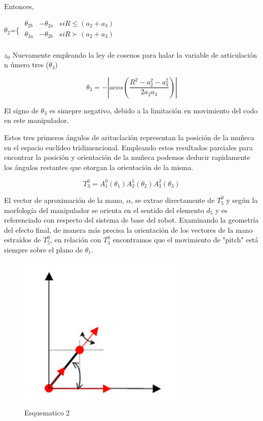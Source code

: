 \documentclass[letter,openright,12pt,spanish]{report}
\begin{document}
Entonces,

\begin{center}
$\theta_2$=\{ $\begin{matrix}
	\theta_{2b} & -\theta_{2a} & si R \leq (a_2+a_3)\\
	\theta_{2a} & -\theta_{2b} & si R \succ (a_2+a_3)\\
\end{matrix}$
\end{center}

$z_0$ Nuevamente empleando la ley de cosenos para halar la variable de articulaci\'on n \'umero tres ($\theta_3$)

\begin{displaymath}
\theta_3=-|acos(\frac{R^2-a^2_2-a^2_3}{2a_2a_3})|
\end{displaymath}

El signo de $\theta_3$ es simepre negativo, debido a la limitaci\'on en movimiento del codo en este manipulador.

Estos tres primeros \'angulos de arituclaci\'on representan la posici\'on de la mu\~neca en el espacio eucl\'ideo tridimencional. Empleando estos resultados parciales para encontrar la posici\'on y orientaci\'on de la mu\~neca podemos deducir rapidamente los \'angulos restantes que otorgan la orientaci\'on de la misma.

\begin{displaymath}
T^0_3=A^0_1(\theta_1)A^1_2(\theta_2)A^2_3(\theta_3)
\end{displaymath} 

El vector de aproximaci\'on de la mano, $\alpha $, se extrae directamente de $T^0_5$ y seg\'un la morfolog\'ia del manipulador se orienta en el sentido del elemento $d_5$ y es referenciado con respecto del sistema de base del robot. Examinando la geometr\'ia del efecto final, de manera m\'as precisa la orientaci\'on de los vectores de la mano estra\'idos de $T^0_5$, en relaci\'on con $T^0_3$ encontramos que el movimiento de "pitch" est\'a siempre sobre el plano de $\theta_1$.

\begin{figure}[htp]
\centering
\includegraphics[width=8cm]{3.jpg}
\caption{Esquematico 2}
\label{Figura 2}
\end{figure}
\end{document}
